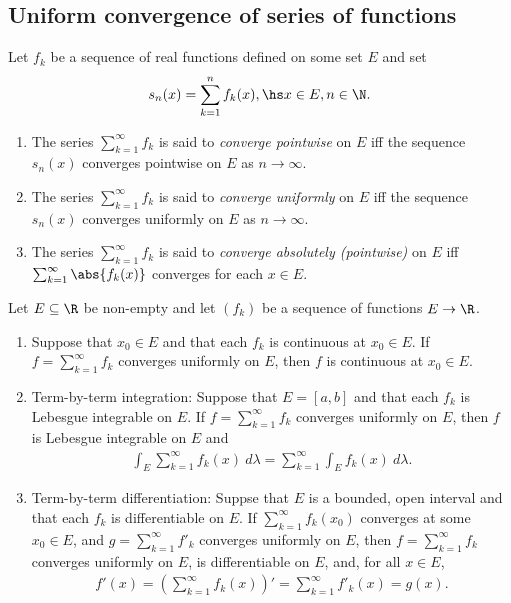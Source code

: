 \documentclass{article}
\begin{document}
\subsection{Uniform convergence of series of functions}

\begin{definition}
	Let $f_k$ be a sequence of real functions defined on some set $E$ and set
	\begin{align*}
		s_n(x) = \sum_{k=1}^n f_k(x),\hs x\in E,n\in\N.
	\end{align*}
	\begin{enumerate}
		\item The series $\sum_{k=1}^\infty f_k$ is said to \emph{converge pointwise} on $E$ iff
		      the sequence $s_n(x)$ converges pointwise on $E$ as $n\to\infty$.
		\item The series $\sum_{k=1}^\infty f_k$ is said to \emph{converge uniformly} on $E$ iff
		      the sequence $s_n(x)$ converges uniformly on $E$ as $n\to\infty$.
		\item The series $\sum_{k=1}^\infty f_k$ is said to \emph{converge absolutely (pointwise)} on $E$ iff
		      $\sum_{k=1}^\infty \abs{f_k(x)}$ converges for each $x\in E$.
	\end{enumerate}
\end{definition}

\begin{theorem}[Notes 2.4]
	Let $E\subseteq\R$ be non-empty and let $(f_k)$ be a sequence of functions $E\to\R$.
	\begin{enumerate}
		\item Suppose that $x_0\in E$ and that each $f_k$ is continuous at $x_0\in E$.
		      If $f=\sum_{k=1}^\infty f_k$ converges uniformly on $E$, then $f$ is continuous at $x_0\in E$.
		\item Term-by-term integration: Suppose that $E=[a,b]$ and that each $f_k$ is Lebesgue integrable on $E$.
		      If $f=\sum_{k=1}^\infty f_k$ converges uniformly on $E$, then $f$ is Lebesgue integrable on $E$
		      and \begin{align*}
			      \int_E\sum_{k=1}^\infty f_k(x)\:d\lambda = \sum_{k=1}^\infty \int_E f_k(x)\:d\lambda.
		      \end{align*}
		\item Term-by-term differentiation: Suppse that $E$ is a bounded, open interval and that each
		      $f_k$ is differentiable on $E$. If $\sum_{k=1}^\infty f_k(x_0)$ converges at some $x_0\in E$,
		      and $g=\sum_{k=1}^\infty f'_k$ converges uniformly on $E$, then $f=\sum_{k=1}^\infty f_k$
		      converges uniformly on $E$, is differentiable on $E$, and, for all $x\in E$, \begin{align*}
			      f'(x) = \left(\sum_{k=1}^\infty f_k(x)\right)' = \sum_{k=1}^\infty f'_k(x)= g(x).
		      \end{align*}
	\end{enumerate}
\end{theorem}
\end{document}
